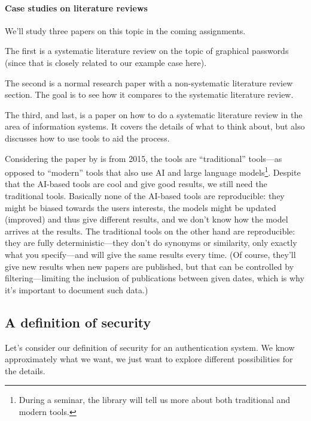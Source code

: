 \paragraph{Case studies on literature reviews}

We'll study three papers on this topic in the coming assignments.

The first\autocite{GraphicalPasswordsSurvey} is a systematic literature review 
on the topic of graphical passwords (since that is closely related to our 
example case here).

The second\autocite{OfPasswordsAndPeople} is a normal research paper with a 
non-systematic literature review section.
The goal is to see how it compares to the systematic literature review.

The third, and last, is a paper on how to do a systematic literature review in 
the area of information systems\autocite{SLRinIS}.
It covers the details of what to think about, but also discusses how to use 
tools to aid the process.

Considering the paper by \citeauthor{SLRinIS} is from 2015, the tools are 
\enquote{traditional} tools---as opposed to \enquote{modern} tools that also 
use AI and large language models\footnote{%
  During a seminar, the library will tell us more about both traditional and 
  modern tools.
}.
Despite that the AI-based tools are cool and give good results, we still need 
the traditional tools.
Basically none of the AI-based tools are reproducible:
they might be biased towards the users interests,
the models might be updated (improved) and thus give different results,
and we don't know how the model arrives at the results.
The traditional tools on the other hand are reproducible:
they are fully deterministic---they don't do synonyms or similarity, only 
exactly what you specify---and will give the same results every time.
(Of course, they'll give new results when new papers are published, but that 
can be controlled by filtering---limiting the inclusion of publications between 
given dates, which is why it's important to document such data.)

\subsection{A definition of security}

Let's consider our definition of security for an authentication system.
We know approximately what we want, we just want to explore different 
possibilities for the details.

